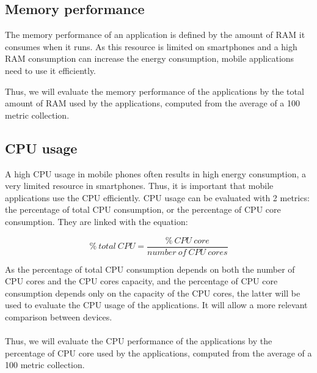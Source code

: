 \documentclass{kththesis}
\begin{document}

\subsection{Memory performance}

The memory performance of an application is defined by the amount of RAM it consumes when it runs. As this resource is limited on smartphones and a high RAM consumption can increase the energy consumption, mobile applications need to use it efficiently. 

Thus, we will evaluate the memory performance of the applications by the total amount of RAM used by the applications, computed from the average of a 100 metric collection. 

\subsection{CPU usage}

A high CPU usage in mobile phones often results in high energy consumption, a very limited resource in smartphones. Thus, it is important that mobile applications use the CPU efficiently. CPU usage can be evaluated with 2 metrics: the percentage of total CPU consumption, or the percentage of CPU core consumption. They are linked with the equation: 

\[\% \ total\ CPU=  \frac{\% \ CPU\ core}{number\ of \ CPU \ cores}  \]

As the percentage of total CPU consumption depends on both the number of CPU cores and the CPU cores capacity, and the percentage of CPU core consumption depends only on the capacity of the CPU cores, the latter will be used to evaluate the CPU usage of the applications. It will allow a more relevant comparison between devices. 

\paragraph{}
Thus, we will evaluate the CPU performance of the applications by the percentage of CPU core used by the applications, computed from the average of a 100 metric collection. 
\end{document}
